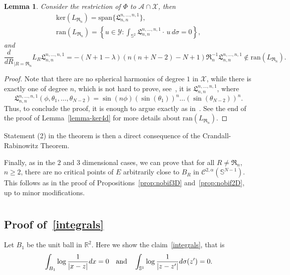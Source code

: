 \documentclass[10pt,reqno,english]{amsart}
\newcommand{\Sd}{\mathbb{S}^2}
\newcommand{\Sn}{\mathbb{S}^{N-1}}
\newcommand{\rn}{{\mathfrak R}_n  }
\newcommand{\R} {\mathbb R}
\newtheorem{lemma}{Lemma}[section]
\theoremstyle{definition}
\numberwithin{equation}{section}
\begin{document}
\begin{lemma}
Consider the restriction of $\Phi$ to $\mathcal A\cap\mathcal X$, then
\begin{gather*}
\mathrm{ker}( L_{\rn})=\mathrm{span}\{\mathfrak L^{n,\dots,n,1}_{n,n}\},\\
\mathrm{ran}(L_{\rn})=\left\{u\in\mathcal Y:\int_{\Sd}\mathfrak L^{n,\dots,n,1}_{n,n}\cdot\,u\,d\sigma=0\right\},
\end{gather*}
and
\[
\frac{d}{dR}_{|R=\rn}L_R \mathfrak L^{n,\dots,n,1}_{n,n}= -(N+1-\lambda)(n(n+N-2)-N+1)\rn^{-1}\mathfrak L^{n,\dots,n,1}_{n,n}\not\in\mathrm{ran}(L_{\rn}).
\]
\end{lemma}
\begin{proof} 
Note that there are no spherical harmonics of degree $1$ in $\mathcal X$, while there is exactly one of degree $n$, which is not hard to prove, see~\cite[Proposition 5.1]{GGT18}, it is $\mathfrak L^{n,\dots,n,1}_{n,n}$, where
\[
\mathfrak L^{n,\dots,n,1}_{n,n}(\phi,\theta_1,\dots,\theta_{N-2})=\sin(n\phi)(\sin(\theta_1))^n\dots(\sin(\theta_{N-2}))^n.
\]
Thus, to conclude the proof, it is enough to argue exactly as in~\cite[Proposition 9]{Fr19}. See the end of the proof of Lemma~\ref{lemma-ker4d} for more details about $\mathrm{ran}(L_{\rn})$.
\end{proof}

Statement (2) in the theorem is then a direct consequence of the Crandall-Rabinowitz Theorem.

Finally, as in the $2$ and $3$ dimensional cases, we can prove that for all $R\not=\rn$, $n\ge2$, there are no critical points of $E$ arbitrarily close to $B_R$ in $\mathcal C^{2,\alpha}(\Sn)$.
This follows as in the proof of Propositions~\ref{prop:nobif3D} and~\ref{prop:nobif2D}, up to minor modifications.



\appendix
\section{}
\label{appendix}


\subsection{Proof of\texorpdfstring{~\eqref{integrals}}{ (3.6)}}
\label{app:int}
Let $B_1$ be the unit ball in $\R^2$.
Here we show the claim~\eqref{integrals}, that is
\[
\int_{B_1} \log {1\over |x-z|} dx = 0\quad\text{and}\quad \int_{\mathbb{S}^1} \log {1\over |z-z'|} d\sigma (z') =0.
\]
\end{document}
